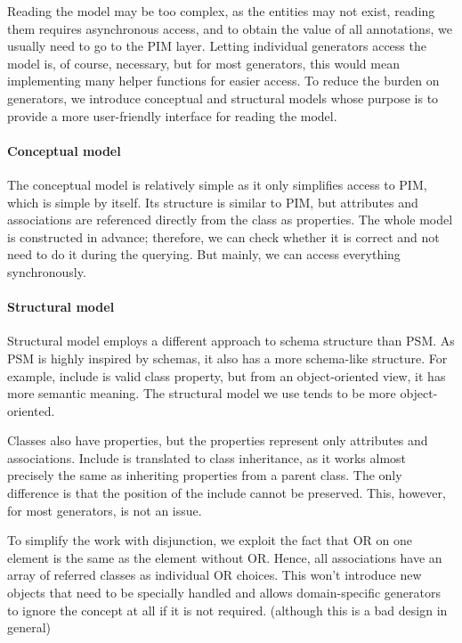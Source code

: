 Reading the model may be too complex, as the entities may not exist, reading them requires asynchronous access, and to obtain the value of all annotations, we usually need to go to the PIM layer. Letting individual generators access the model is, of course, necessary, but for most generators, this would mean implementing many helper functions for easier access. To reduce the burden on generators, we introduce conceptual and structural models whose purpose is to provide a more user-friendly interface for reading the model.

\paragraph{Conceptual model} The conceptual model is relatively simple as it only simplifies access to PIM, which is simple by itself. Its structure is similar to PIM, but attributes and associations are referenced directly from the class as properties. The whole model is constructed in advance; therefore, we can check whether it is correct and not need to do it during the querying. But mainly, we can access everything synchronously.

\paragraph{Structural model} Structural model employs a different approach to schema structure than PSM. As PSM is highly inspired by schemas, it also has a more schema-like structure. For example, include is valid class property, but from an object-oriented view, it has more semantic meaning. The structural model we use tends to be more object-oriented.

Classes also have properties, but the properties represent only attributes and associations. Include is translated to class inheritance, as it works almost precisely the same as inheriting properties from a parent class. The only difference is that the position of the include cannot be preserved. This, however, for most generators, is not an issue.

To simplify the work with disjunction, we exploit the fact that OR on one element is the same as the element without OR. Hence, all associations have an array of referred classes as individual OR choices. This won't introduce new objects that need to be specially handled and allows domain-specific generators to ignore the concept at all if it is not required. (although this is a bad design in general)

